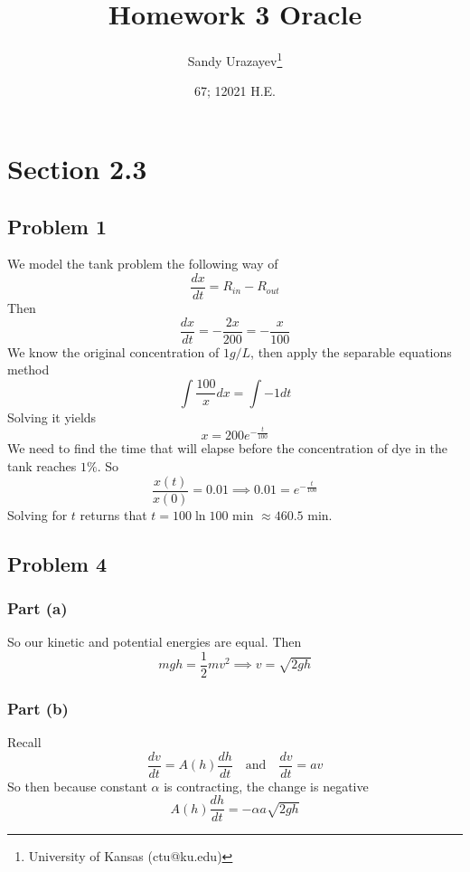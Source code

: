 \documentclass[12pt]{article}
\author{Sandy Urazayev\thanks{University of Kansas (ctu@ku.edu)}}
\date{67; 12021 H.E.}
\title{Homework 3 Oracle}
\begin{document}
\maketitle
\section*{Section 2.3}
\label{sec:org74b13f4}
\subsection*{Problem 1}
\label{sec:orga4c6a4f}
We model the tank problem the following way of
\begin{equation*}
  \frac{dx}{dt}=R_{in}-R_{out}
\end{equation*}
Then
\begin{equation*}
  \frac{dx}{dt}=-\frac{2x}{200}=-\frac{x}{100}
\end{equation*}
We know the original concentration of \(1g/L\), then apply the separable
equations method
\begin{equation*}
  \int \frac{100}{x} dx = \int -1 dt
\end{equation*}
Solving it yields
\begin{equation*}
x = 200 e^{-\frac{t}{100}}
\end{equation*}
We need to find the time that will elapse before the concentration of dye in
the tank reaches \(1\%\). So
\begin{equation*}
  \frac{x(t)}{x(0)} = 0.01 \implies 0.01 = e^{-\frac{t}{100}}
\end{equation*}
Solving for \(t\) returns that \(t = 100 \ln 100\) min \(\approx 460.5\) min. 
\subsection*{Problem 4}
\label{sec:org862d36c}
\subsubsection*{Part (a)}
\label{sec:orgb4c50bd}
So our kinetic and potential energies are equal. Then
\begin{equation*}
  mgh = \frac{1}{2}mv^2 \implies v = \sqrt{2gh}
\end{equation*}
\subsubsection*{Part (b)}
\label{sec:org5781216}
Recall 
\begin{equation*}
  \frac{dv}{dt} = A(h) \frac{dh}{dt} \quad\text{and}\quad \frac{dv}{dt} = av
\end{equation*}
So then because constant \(\alpha\) is contracting, the change is negative
\begin{equation*}
  A(h)\frac{dh}{dt} = -\alpha a \sqrt{2gh}
\end{equation*}
\end{document}
